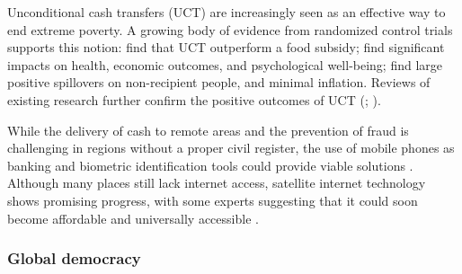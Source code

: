 Unconditional cash transfers (UCT) are increasingly seen as an effective way to end extreme poverty. A growing body of evidence from randomized control trials supports this notion:  find that UCT outperform a food subsidy;  find significant impacts on health, economic outcomes, and psychological well-being;  find large positive spillovers on non-recipient people, and minimal inflation. 
Reviews of existing research further confirm the positive outcomes of UCT (; ). %

While the delivery of cash to remote areas and the prevention of fraud is challenging in regions without a proper civil register, the use of mobile phones as banking and biometric identification tools could provide viable solutions . Although many places still lack internet access, satellite internet technology shows promising progress, with some experts suggesting that it could soon become affordable and universally accessible .

\subsubsection{Global democracy}\label{subsubsec:literature_democracy}

